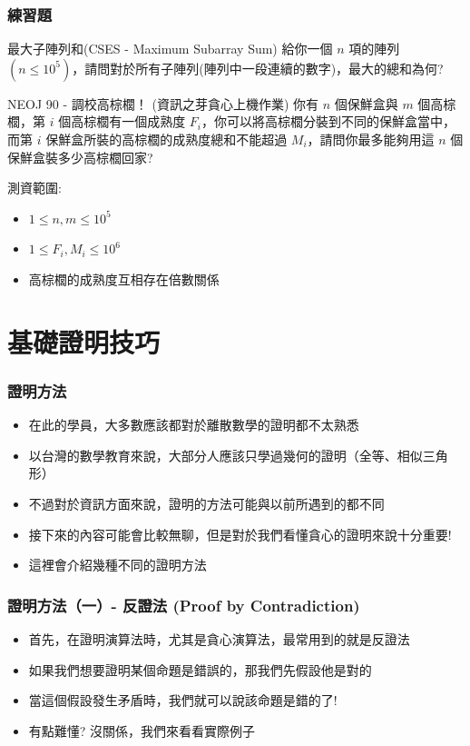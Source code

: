 \documentclass[aspectratio=169]{beamer}
\begin{document}
\begin{frame}
\frametitle{練習題}
    \begin{block}{最大子陣列和(CSES - Maximum Subarray Sum)}
        給你一個 $n$ 項的陣列 $(n \le 10^5)$，請問對於所有子陣列(陣列中一段連續的數字)，最大的總和為何?
    \end{block}
    \begin{block}{NEOJ 90 - 調校高棕櫚！ (資訊之芽貪心上機作業)}
        你有 $n$ 個保鮮盒與 $m$ 個高棕櫚，第 $i$ 個高棕櫚有一個成熟度 $F_i$，你可以將高棕櫚分裝到不同的保鮮盒當中，而第 $i$ 保鮮盒所裝的高棕櫚的成熟度總和不能超過 $M_i$，請問你最多能夠用這 $n$ 個保鮮盒裝多少高棕櫚回家?
        
        測資範圍: 
        \begin{itemize}
            \item $1 \le n,m \le 10^5$
            \item $1 \le F_i, M_i \le 10^6$
            \item 高棕櫚的成熟度互相存在倍數關係
        \end{itemize}
    \end{block}
\end{frame}

\section{基礎證明技巧}
    
\begin{frame}
\frametitle{證明方法}
    \begin{itemize}
        \item<1-> 在此的學員，大多數應該都對於離散數學的證明都不太熟悉
        \item<1-> 以台灣的數學教育來說，大部分人應該只學過幾何的證明（全等、相似三角形）　
        \item<1-> 不過對於資訊方面來說，證明的方法可能與以前所遇到的都不同
        \item<1-> 接下來的內容可能會比較無聊，但是對於我們看懂貪心的證明來說十分重要!
        \item<2-> 這裡會介紹幾種不同的證明方法
    \end{itemize}
\end{frame}

\begin{frame}
\frametitle{證明方法（一）- 反證法 (Proof by Contradiction)}
    \begin{itemize}
        \item<1-> 首先，在證明演算法時，尤其是貪心演算法，最常用到的就是反證法
        \item<2-> 如果我們想要證明某個命題是錯誤的，那我們先假設他是對的
        \item<2-> 當這個假設發生矛盾時，我們就可以說該命題是錯的了!
        \item<3-> 有點難懂? 沒關係，我們來看看實際例子
    \end{itemize}
\end{frame}
\end{document}
